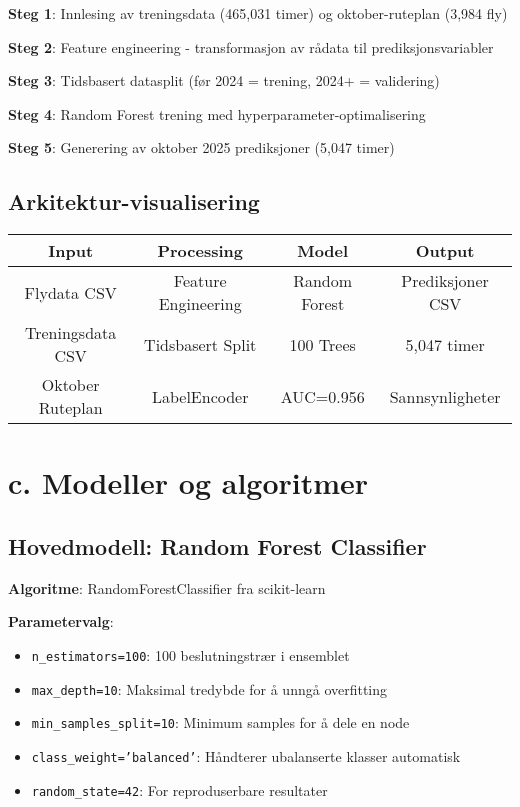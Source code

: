 \documentclass[11pt,a4paper]{article}
\begin{document}
\textbf{Steg 1}: Innlesing av treningsdata (465,031 timer) og oktober-ruteplan (3,984 fly)

\textbf{Steg 2}: Feature engineering - transformasjon av rådata til prediksjonsvariabler

\textbf{Steg 3}: Tidsbasert datasplit (før 2024 = trening, 2024+ = validering)

\textbf{Steg 4}: Random Forest trening med hyperparameter-optimalisering

\textbf{Steg 5}: Generering av oktober 2025 prediksjoner (5,047 timer)

\subsection{Arkitektur-visualisering}
\begin{center}
\begin{tabular}{|c|c|c|c|}
\hline
\textbf{Input} & \textbf{Processing} & \textbf{Model} & \textbf{Output} \\
\hline
Flydata CSV & Feature Engineering & Random Forest & Prediksjoner CSV \\
Treningsdata CSV & Tidsbasert Split & 100 Trees & 5,047 timer \\
Oktober Ruteplan & LabelEncoder & AUC=0.956 & Sannsynligheter \\
\hline
\end{tabular}
\end{center}

\section{c. Modeller og algoritmer}

\subsection{Hovedmodell: Random Forest Classifier}

\textbf{Algoritme}: RandomForestClassifier fra scikit-learn

\textbf{Parametervalg}:
\begin{itemize}
    \item \texttt{n\_estimators=100}: 100 beslutningstrær i ensemblet
    \item \texttt{max\_depth=10}: Maksimal tredybde for å unngå overfitting
    \item \texttt{min\_samples\_split=10}: Minimum samples for å dele en node
    \item \texttt{class\_weight='balanced'}: Håndterer ubalanserte klasser automatisk
    \item \texttt{random\_state=42}: For reproduserbare resultater
\end{itemize}
\end{document}
